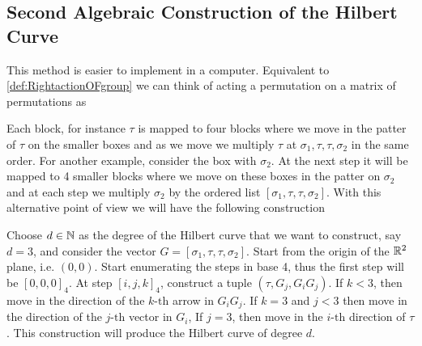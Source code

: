 \documentclass[12pt]{article}
\begin{document}
\subsection*{Second Algebraic Construction of the Hilbert Curve}
This method is easier to implement in a computer. Equivalent to \autoref{def:RightactionOFgroup} we can think of acting a permutation on a matrix of permutations as 

Each block, for instance $ \tau $ is mapped to four blocks where we move in the patter of $ \tau $ on the smaller boxes and as we move we multiply $ \tau $ at $ \sigma_1, \tau, \tau, \sigma_2 $ in the same order. For another example, consider the box with $ \sigma_2 $. At the next step it will be mapped to 4 smaller blocks where we move on these boxes in the patter on $ \sigma_2 $ and at each step we multiply $ \sigma_2 $ by the ordered list $ [\sigma_1, \tau, \tau, \sigma_2] $.
With this alternative point of view we will have the following construction
\begin{construction}
	Choose $ d \in \mathbb{N} $ as the degree of the Hilbert curve that we want to construct, say $ d=3 $, and consider the vector $ G = [\sigma_1,\tau,\tau,\sigma_2] $. Start from the origin of the $ \mathbb{R}^2 $ plane, i.e. $ (0,0) $. Start enumerating the steps in base 4, thus the first step will be $ [0,0,0]_4 $. At step $ [i,j,k]_4 $, construct a tuple $ (\tau, G_j,G_i G_j) $. If $ k<3 $, then move in the direction of the $ k\text{-th} $ arrow in $ G_i G_j $. If $ k=3 $ and $ j<3 $ then move in the direction of the $ j\text{-th} $ vector in $ G_i $, If $ j=3$, then move in the $ i\text{-th} $ direction of $ \tau $. This construction will produce the Hilbert curve of degree $ d $.
\end{construction}
\end{document}
